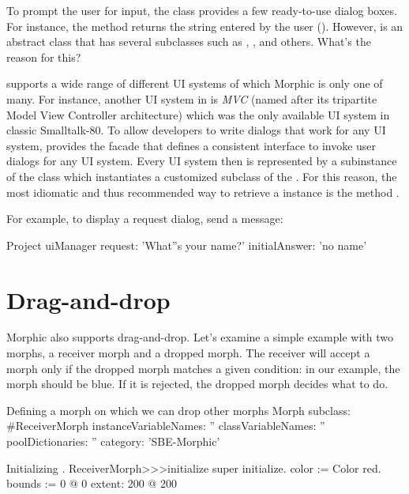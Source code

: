 \documentclass[a4paper,10pt,twoside]{book}
\begin{document}
To prompt the user for input, the  class provides a few ready-to-use dialog boxes.
For instance, the  method returns the string entered by the user ().
However,  is an abstract class that has several subclasses such as , , and others.
What's the reason for this?

\sq supports a wide range of different UI systems of which Morphic is only one of many.
For instance, another UI system in \sq is \emph{MVC} (named after its tripartite Model View Controller architecture) which was the only available UI system in classic Smalltalk-80.
To allow developers to write dialogs that work for any UI system, \sq provides the  facade that defines a consistent interface to invoke user dialogs for any UI system.
Every UI system then is represented by a subinstance of the class  which instantiates a customized subclass of the .
For this reason, the most idiomatic and thus recommended way to retrieve a  instance is the method .

For example, to display a request dialog, send a  message:
\begin{code}{}
Project uiManager
	request: 'What''s your name?'
	initialAnswer: 'no name'
\end{code}

\section{Drag-and-drop}

Morphic also supports drag-and-drop. Let's examine a simple example with two morphs, a receiver morph and a dropped morph. 
The receiver will accept a morph only if the dropped morph matches a given condition: in our example,  the morph should be blue. If it is rejected, the dropped morph decides what to do.

\begin{classdef}{Defining a morph on which we can drop other morphs}
Morph subclass: #ReceiverMorph
	instanceVariableNames: ''
	classVariableNames: ''
	poolDictionaries: ''
	category: 'SBE-Morphic'
\end{classdef}

\begin{method}{Initializing .}
ReceiverMorph>>>initialize
	super initialize.
	color := Color red.
	bounds := 0 @ 0 extent: 200 @ 200
\end{method}
\end{document}
